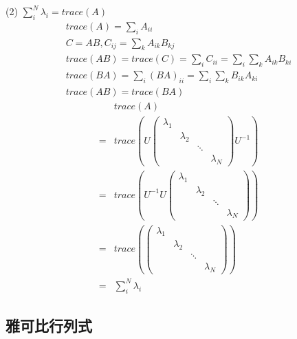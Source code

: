 (2) $\sum_{i}^{N} \lambda_{i}=trace(A)$
\begin{gather}
    trace(A)=\sum_{i}A_{ii}\\
    C=AB, C_{ij}=\sum_{k}A_{ik}B_{kj}\\
    trace(AB)=trace(C)=\sum_{i}C_{ii}=\sum_{i} \sum_{k}A_{ik}B_{ki}\\
    trace(BA)=\sum_{i} (BA)_{ii} = \sum_{i} \sum_{k} B_{ik}A_{ki}\\
    trace(AB)=trace(BA)
\end{gather}
\begin{align}
    &trace(A)\\
    =&trace(U
    \begin{pmatrix}
        \lambda_{1} &  &  & \\
         & \lambda_{2} &  & \\
         &  & \ddots & \\
         &  &  & \lambda_{N}
    \end{pmatrix}
    U^{-1})\\
    =&trace(U^{-1}U
    \begin{pmatrix}
        \lambda_{1} &  &  & \\
         & \lambda_{2} &  & \\
         &  & \ddots & \\
         &  &  & \lambda_{N}
    \end{pmatrix}
    )\\
    =&trace(
    \begin{pmatrix}
        \lambda_{1} &  &  & \\
         & \lambda_{2} &  & \\
         &  & \ddots & \\
         &  &  & \lambda_{N}
    \end{pmatrix}    
    )\\
    =&\sum_{i}^{N} \lambda_{i}
\end{align}

\subsection{雅可比行列式}

